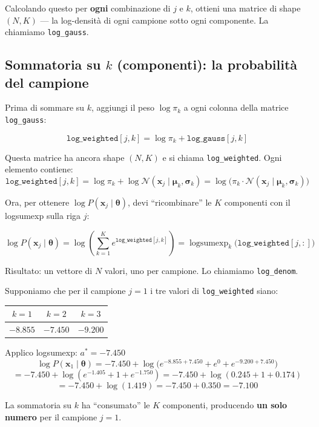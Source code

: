 \documentclass[11pt,a4paper]{article}
\begin{document}
Calcolando questo per \textbf{ogni} combinazione di $j$ e $k$, ottieni una matrice di shape $(N, K)$ --- la log-densit\`a di ogni campione sotto ogni componente. La chiamiamo \texttt{log\_gauss}.

\subsection{Sommatoria su $k$ (componenti): la probabilit\`a del campione}

Prima di sommare su $k$, aggiungi il peso $\log\pi_k$ a ogni colonna della matrice \texttt{log\_gauss}:

$$\texttt{log\_weighted}[j, k] = \log\pi_k + \texttt{log\_gauss}[j, k]$$

Questa matrice ha ancora shape $(N, K)$ e si chiama \texttt{log\_weighted}. Ogni elemento contiene:
$$\texttt{log\_weighted}[j, k] = \log\pi_k + \log\mathcal{N}(\mathbf{x}_j\mid\boldsymbol{\mu}_k, \boldsymbol{\sigma}_k) = \log\!\bigl(\pi_k \cdot \mathcal{N}(\mathbf{x}_j\mid\boldsymbol{\mu}_k, \boldsymbol{\sigma}_k)\bigr)$$

Ora, per ottenere $\log P(\mathbf{x}_j\mid\boldsymbol{\theta})$, devi ``ricombinare'' le $K$ componenti con il logsumexp sulla riga $j$:

$$\log P(\mathbf{x}_j\mid\boldsymbol{\theta}) = \log\!\left(\sum_{k=1}^{K} e^{\texttt{log\_weighted}[j,k]}\right) = \operatorname{logsumexp}_k\!\bigl(\texttt{log\_weighted}[j,:]\bigr)$$

Risultato: un vettore di $N$ valori, uno per campione. Lo chiamiamo \texttt{log\_denom}.

\begin{exbox}[Esempio: dalla matrice al vettore, con $K=3$]
Supponiamo che per il campione $j=1$ i tre valori di \texttt{log\_weighted} siano:
\begin{center}
\begin{tabular}{ccc}
$k=1$ & $k=2$ & $k=3$ \\
\midrule
$-8.855$ & $-7.450$ & $-9.200$ \\
\end{tabular}
\end{center}

Applico logsumexp: $a^* = -7.450$
$$\log P(\mathbf{x}_1\mid\boldsymbol{\theta}) = -7.450 + \log\!\bigl(e^{-8.855+7.450} + e^{0} + e^{-9.200+7.450}\bigr)$$
$$= -7.450 + \log(e^{-1.405} + 1 + e^{-1.750}) = -7.450 + \log(0.245 + 1 + 0.174)$$
$$= -7.450 + \log(1.419) = -7.450 + 0.350 = \mathbf{-7.100}$$

La sommatoria su $k$ ha ``consumato'' le $K$ componenti, producendo \textbf{un solo numero} per il campione $j=1$.
\end{exbox}
\end{document}
